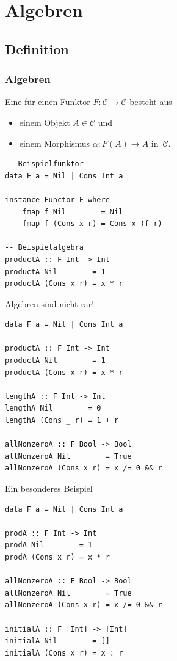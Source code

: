 \documentclass[12pt,compress,ngerman,utf8,t]{beamer}
\renewcommand{\C}{\mathcal{C}}
\newcommand{\hil}[1]{{\usebeamercolor[fg]{item}{\textbf{#1}}}}
\begin{document}
\section{Algebren}

\subsection{Definition}

\begin{frame}[fragile]\frametitle{Algebren}
  Eine \hil{Algebra} für einen Funktor $F : \C \to \C$ besteht aus
  \begin{itemize}
    \item einem Objekt $A \in \C$ und
    \item einem Morphismus $\alpha : F(A) \to A$ in~$\C$.
  \end{itemize}

  \begin{verbatim}
-- Beispielfunktor
data F a = Nil | Cons Int a

instance Functor F where
    fmap f Nil        = Nil
    fmap f (Cons x r) = Cons x (f r)

-- Beispielalgebra
productA :: F Int -> Int
productA Nil        = 1
productA (Cons x r) = x * r
  \end{verbatim}
\end{frame}

\begin{frame}[fragile]{Algebren sind nicht rar!}
  \begin{verbatim}
data F a = Nil | Cons Int a

productA :: F Int -> Int
productA Nil        = 1
productA (Cons x r) = x * r

lengthA :: F Int -> Int
lengthA Nil        = 0    
lengthA (Cons _ r) = 1 + r

allNonzeroA :: F Bool -> Bool
allNonzeroA Nil        = True
allNonzeroA (Cons x r) = x /= 0 && r
  \end{verbatim}
\end{frame}

\begin{frame}[fragile]{Ein besonderes Beispiel}
  \begin{verbatim}
data F a = Nil | Cons Int a

prodA :: F Int -> Int
prodA Nil        = 1
prodA (Cons x r) = x * r

allNonzeroA :: F Bool -> Bool
allNonzeroA Nil        = True
allNonzeroA (Cons x r) = x /= 0 && r

initialA :: F [Int] -> [Int]
initialA Nil        = []
initialA (Cons x r) = x : r
  \end{verbatim}
\end{frame}
\end{document}
